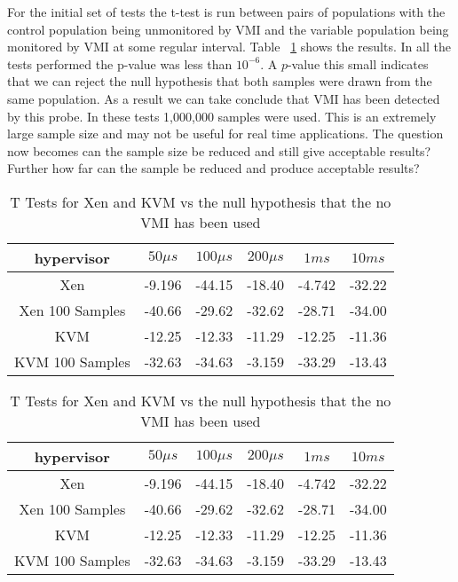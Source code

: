 For the initial set of tests the t-test is run between pairs of populations with the control population being unmonitored by VMI and the variable population being monitored by VMI at some regular interval. Table ~\ref{TTestsCacheTiming} shows the results. In all the tests performed the p-value was less than $10^{−6}$. A $p$-value this small indicates that we can reject the null hypothesis that both samples were drawn from the same population. As a result we can take conclude that VMI has been detected by this probe. In these tests 1,000,000 samples were used. This is an extremely large sample size and may not be useful for real time applications. The question now becomes can the sample size be reduced and still give acceptable results? Further how far can the sample be reduced and produce acceptable results? 


\begin{table}\label{TTestsCacheTiming}
\centering
  \begin{tabular}{| c | c | c | c | c | c |}
    \hline
    hypervisor & $50\mu s$ & $100\mu s$ & $200 \mu s$ & $1ms$ & $10ms$ \\ \hline
    Xen & -9.196 & -44.15 & -18.40 & -4.742 & -32.22 \\ \hline 
    Xen 100 Samples & -40.66 & -29.62 & -32.62 & -28.71 & -34.00 \\ \hline
    KVM & -12.25 & -12.33 & -11.29 & -12.25 & -11.36  \\ \hline
    KVM 100 Samples & -32.63 & -34.63 & -3.159 & -33.29 & -13.43  \\ \hline 
  \end{tabular}
  \caption{T Tests for Xen and KVM vs the null hypothesis that the no VMI has been used}
\end{table} 


\begin{table}\label{MannWhitneyCacheTiming}
  \centering
  \begin{tabular}{| c | c | c | c | c | c |}
    \hline
    hypervisor & $50\mu s$ & $100\mu s$ & $200 \mu s$ & $1ms$ & $10ms$ \\ \hline
    Xen & -9.196 & -44.15 & -18.40 & -4.742 & -32.22 \\ \hline 
    Xen 100 Samples & -40.66 & -29.62 & -32.62 & -28.71 & -34.00 \\ \hline
    KVM & -12.25 & -12.33 & -11.29 & -12.25 & -11.36  \\ \hline
    KVM 100 Samples & -32.63 & -34.63 & -3.159 & -33.29 & -13.43  \\ \hline
  \end{tabular}
  \caption{T Tests for Xen and KVM vs the null hypothesis that the no VMI has been used}
\end{table}

